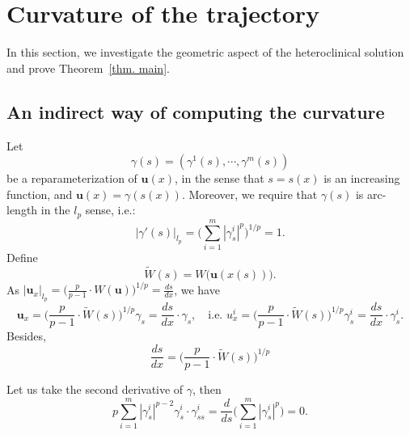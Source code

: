 \documentclass[11pt,twoside,reqno]{amsart}
\numberwithin{equation}{section}
\begin{document}
\section{Curvature of the trajectory}
In this section, we investigate the geometric aspect of the heteroclinical solution and prove Theorem~\ref{thm. main}.
\subsection{An indirect way of computing the curvature}
Let $$\gamma(s)=(\gamma^{1}(s),\cdots,\gamma^{m}(s))$$ be a reparameterization of $\mathbf{u}(x)$, in the sense that $s=s(x)$ is an increasing function, and $\mathbf{u}(x)=\gamma(s(x))$. Moreover, we require that $\gamma(s)$ is arc-length in the $l_{p}$ sense, i.e.:
\begin{equation}\label{eq. unit lp curve}
    |\gamma'(s)|_{l_{p}}=\Big(\sum_{i=1}^{m}|\gamma^{i}_{s}|^{p}\Big)^{1/p}=1.
\end{equation}
Define
\begin{equation*}
    \widetilde{W}(s)=W\Big(\mathbf{u}(x(s))\Big).
\end{equation*}
As $|\mathbf{u}_{x}|_{l_{p}}=\Big(\frac{p}{p-1}\cdot W(\mathbf{u})\Big)^{1/p}=\frac{ds}{dx}$, we have
\begin{equation*}
    \mathbf{u}_{x}=\Big(\frac{p}{p-1}\cdot\widetilde{W}(s)\Big)^{1/p}\gamma_{s}=\frac{ds}{dx}\cdot\gamma_{s},\quad\mbox{i.e. }u^{i}_{x}=\Big(\frac{p}{p-1}\cdot\widetilde{W}(s)\Big)^{1/p}\gamma^{i}_{s}=\frac{ds}{dx}\cdot\gamma^{i}_{s}.
\end{equation*}
Besides,
\begin{equation*}
    \frac{ds}{dx}=\Big(\frac{p}{p-1}\cdot\widetilde{W}(s)\Big)^{1/p}
\end{equation*}

Let us take the second derivative of $\gamma$, then
\begin{equation}\label{eq. p-perpendicular}
    p\sum_{i=1}^{m}|\gamma^{i}_{s}|^{p-2}\gamma^{i}_{s}\cdot\gamma^{i}_{ss}=\frac{d}{ds}\Big(\sum_{i=1}^{m}|\gamma^{i}_{s}|^{p}\Big)=0.
\end{equation}
\end{document}
